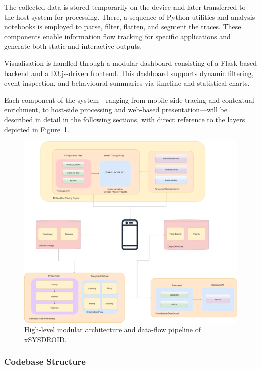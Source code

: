 \documentclass[a4paper,12pt]{report}
\begin{document}
The collected data is stored temporarily on the device and later transferred to the host system for processing. There, a sequence of Python utilities and analysis notebooks is employed to parse, filter, flatten, and segment the traces. These components enable information flow tracking for specific applications and generate both static and interactive outputs.

Visualisation is handled through a modular dashboard consisting of a Flask-based backend and a D3.js-driven frontend. This dashboard supports dynamic filtering, event inspection, and behavioural summaries via timeline and statistical charts.

Each component of the system—ranging from mobile-side tracing and contextual enrichment, to host-side processing and web-based presentation—will be described in detail in the following sections, with direct reference to the layers depicted in Figure~\ref{fig:architecture}.
\begin{figure}[H]
\centering
\includegraphics[width=1\textwidth]{architecture.png}
\caption{High-level modular architecture and data-flow pipeline of xSYSDROID.}
\label{fig:architecture}
\end{figure}



\subsubsection{Codebase Structure}
\end{document}
